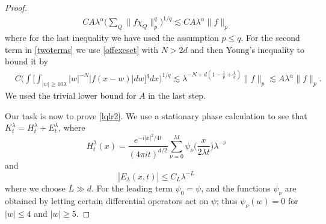 \documentclass[11pt]{amsart}
\theoremstyle{definition}
\numberwithin{theorem}{section}
\numberwithin{definition}{section}
\numberwithin{equation}{section}
\renewcommand{\le}{\leqslant}
\renewcommand{\ge}{\geqslant}
\def\lc{\lesssim}
\def\la{\lambda}             \def\La{\Lambda}
\def\bbR{{\mathbb {R}}}
\renewcommand{\le}{\leqslant}
\renewcommand{\ge}{\geqslant}
\begin{document}
\begin{proof}[Proof]
\begin{align*}
CA\la^\alpha\Big(\sum_Q\|f\chi_Q\|_p^q\Big)^{1/q} \lc CA\la^\alpha
\|f\|_p
\end{align*}
where for the last inequality we have used the assumption $p\le q$.
For the second term in \eqref{twoterms} we use \eqref{offexcset}
with $N>2d$ and then Young's inequality
 to bound it by
\begin{align*}&
C\Big(\int \Big[
 \int_{|w|\ge 10\la}
|w|^{-N}|f(x-w)|dw\Big]^q dx\Big)^{1/q} \lc \la^{-N+d(1-\frac
1p+\frac 1q)}\|f\|_p \lc A\la^{\alpha}\|f\|_p.
\end{align*}
We used the trivial  lower bound for $A$ in the last step.


Our task is now to prove \eqref{lqlr2}.
We use
a   stationary phase calculation
to see that
$K^\la_t= H^\la_t+E_t^\la$, where
$$H^\la_t(x) =  \frac{e^{-i|x|^2/4t}}{(4\pi it)^{d/2}}
\sum_{\nu=0}^M\psi_\nu\big(\frac{x}{2\la t}
\big)\la^{-\nu}$$
and $$|E_\la(x,t)|\le C_L \la^{-L}$$
where we choose $L\gg d$. For the leading term $\psi_0=\psi$, and  the functions $\psi_\nu$
are obtained by letting certain differential operators act on $\psi$; thus $\psi_\nu(w)=0$ for $|w|\le 4$ and
$|w|\ge 5$.



\end{proof}
\end{document}
